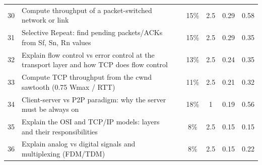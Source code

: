 {\begin{xltabular}{\linewidth}{r>{\raggedright\arraybackslash}Xccccc}
30 & Compute throughput of a packet-switched network or link &  & 15\% & 2.5 & 0.29 & 0.58\\
31 & Selective Repeat: find pending packets/ACKs from Sf, Sn, Rn values &  & 15\% & 2.5 & 0.29 & 0.35\\
32 & Explain flow control vs error control at the transport layer and how TCP does flow control &  & 13\% & 2.5 & 0.24 & 0.35\\
33 & Compute TCP throughput from the cwnd sawtooth (0.75 Wmax / RTT) &  & 11\% & 2.5 & 0.21 & 0.32\\
34 & Client-server vs P2P paradigm: why the server must be always on &  & 18\% & 1 & 0.19 & 0.56\\
35 & Explain the OSI and TCP/IP models: layers and their responsibilities &  & 8\% & 2.5 & 0.15 & 0.15\\
36 & Explain analog vs digital signals and multiplexing (FDM/TDM) &  & 8\% & 2.5 & 0.15 & 0.22\\
\end{xltabular}}

